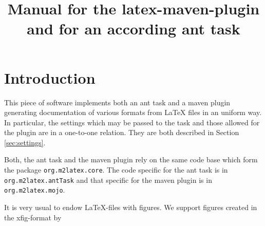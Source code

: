 \documentclass[12pt]{article}
\title{Manual for the latex-maven-plugin and for an according ant task }
\begin{document}
\maketitle

\tableofcontents

\section{Introduction}

This piece of software implements both an ant task and a maven plugin 
generating documentation of various formats from LaTeX files 
in an uniform way. 
In particular, the settings which may be passed to the task 
and those allowed for the plugin are in a one-to-one relation. 
They are both described in Section \ref{sec:settings}. 

Both, the ant task and the maven plugin rely on the same code base 
which form the package {\tt org.m2latex.core}. 
The code specific for the ant task is in {\tt org.m2latex.antTask} 
and that specific for the maven plugin is in {\tt org.m2latex.mojo}. 

It is very usual to endow LaTeX-files with figures. 
We support figures created in the xfig-format 
by 
\end{document}
